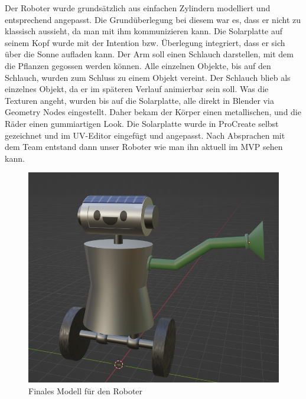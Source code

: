 Der Roboter wurde grundsätzlich aus einfachen Zylindern modelliert und entsprechend angepasst. Die Grundüberlegung bei diesem war es, dass er nicht zu klassisch aussieht, da man mit ihm kommunizieren kann. Die Solarplatte auf seinem Kopf wurde mit der Intention bzw. Überlegung integriert, dass er sich über die Sonne aufladen kann. Der Arm soll einen Schlauch darstellen, mit dem die Pflanzen gegossen werden können. Alle einzelnen Objekte, bis auf den Schlauch, wurden zum Schluss zu einem Objekt vereint. Der Schlauch blieb als einzelnes Objekt, da er im späteren Verlauf animierbar sein soll. Was die Texturen angeht, wurden bis auf die Solarplatte, alle direkt in Blender via Geometry Nodes eingestellt. Daher bekam der Körper einen metallischen, und die Räder einen gummiartigen Look. Die Solarplatte wurde in ProCreate selbst gezeichnet und im UV-Editor eingefügt und angepasst. Nach Absprachen mit dem Team entstand dann unser Roboter wie man ihn aktuell im MVP sehen kann. 
\begin{figure}[h]
	\centering
	\includegraphics[height=0.3\pageheight,keepaspectratio]{pics/10} 
	\caption{Finales Modell für den Roboter}
\end{figure}
\par
